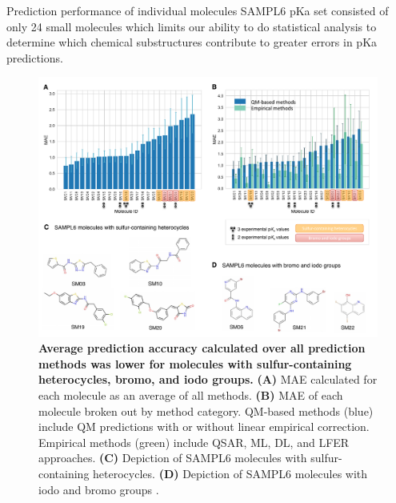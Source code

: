 \documentclass[9pt,lineno,final]{elife}
\begin{document}
Prediction performance of individual molecules
SAMPL6 pKa set consisted of only 24 small molecules which limits our ability to do statistical analysis to determine which chemical substructures contribute to greater errors in pKa predictions.











\begin{figure}
\centering
\includegraphics[width=1.0\linewidth]{figures/typeIII_molecular_MAE_fig.pdf}
\caption{{\bf Average prediction accuracy calculated over all prediction methods was lower for molecules with sulfur-containing heterocycles, bromo, and iodo groups.}
{\bf(A)} MAE calculated for each molecule as an average of all methods. {\bf(B)} MAE of each molecule broken out by method category. QM-based methods (blue) include QM predictions with or without linear empirical correction. Empirical methods (green) include QSAR, ML, DL, and LFER approaches. {\bf(C)} Depiction of SAMPL6 molecules with sulfur-containing heterocycles. {\bf(D)} Depiction of SAMPL6 molecules with iodo and bromo groups .
}
\label{fig:typeIII_molecular_MAE}
\end{figure}
\end{document}
